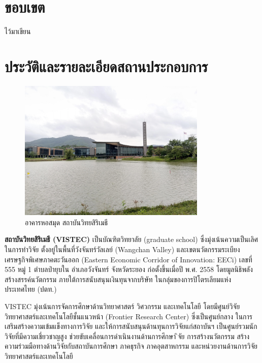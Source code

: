 \documentclass[16pt,a4]{internshipreport}
\begin{document}
\section{ขอบเขต}
ไว้มาเขียน

\section{ประวัติและรายละเอียดสถานประกอบการ}

\begin{figure}[H]
    \centering
    \includegraphics[width=0.8\textwidth]{images/vistec_v.jpg}
    \caption{อาคารหอสมุด สถาบันวิทยสิริเมธี}
\end{figure}

\textbf{สถาบันวิทยสิริเมธี (VISTEC)} เป็นบัณฑิตวิทยาลัย (graduate school) ซึ่งมุ่งเน้นความเป็นเลิศในการทำวิจัย 
ตั้งอยู่ในพื้นที่วังจันทร์วัลเลย์ (Wangchan Valley) และเขตนวัตกรรมระเบียงเศรษฐกิจพิเศษภาคตะวันออก
(Eastern Economic Corridor of Innovation: EECi) เลขที่ 555 หมู่ 1 ตำบลป่ายุบใน อำเภอวังจันทร์ จังหวัดระยอง
ก่อตั้งขึ้นเมื่อปี พ.ศ. 2558 โดยมูลนิธิพลังสร้างสรรค์นวัตกรรม ภายใต้การสนับสนุนเงินทุนจากบริษัท
ในกลุ่มของการปิโตรเลียมแห่งประเทศไทย (ปตท.)

VISTEC มุ่งเน้นการจัดการศึกษาด้านวิทยาศาสตร์ วิศวกรรม และเทคโนโลยี โดยมีศูนย์วิจัยวิทยาศาสตร์และเทคโนโลยีชั้นแนวหน้า
(Frontier Research Center) ซึ่งเป็นศูนย์กลาง ในการเสริมสร้างความเข้มแข็งทางการวิจัย
และให้การสนับสนุนด้านทุนการวิจัยแก่สถาบันฯ เป็นศูนย์รวมนักวิจัยที่มีความเชี่ยวชาญสูง ช่วยขับเคลื่อนการดำเนินงานด้านการศึกษา 
ิจัย การสร้างนวัตกรรม สร้างความร่วมมือทางด้านวิจัยกับสถาบันการศึกษา ภาคธุรกิจ ภาคอุตสาหกรรม
และหน่วยงานด้านการวิจัยวิทยาศาสตร์และเทคโนโลยี
\end{document}
